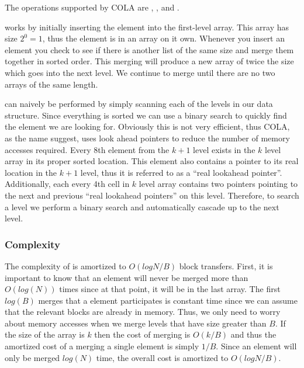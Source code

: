 \documentclass{style}
\begin{document}
The operations supported by COLA are \Search, \Insert, and \Scan.

\Insert works by initially inserting the element into the first-level array.
This array has size $2^0 = 1$, thus the element is in an array on it own.
Whenever you insert an element you check to see if there is another list of
the same size and merge them together in sorted order. This merging will
produce a new array of twice the size which goes into the next level. We
continue to merge until there are no two arrays of the same length.

\Search can naively be performed by simply scanning each of the levels in our
data structure. Since everything is sorted we can use a binary search to
quickly find the element we are looking for. Obviously this is not very
efficient, thus COLA, as the name suggest, uses look ahead pointers to reduce
the number of memory accesses required. Every 8th element from the $k+1$ level
exists in the $k$ level array in its proper sorted location. This element also
contains a pointer to its real location in the $k+1$ level, thus it is
referred to as a ``real lookahead pointer''. Additionally, each every 4th cell
in $k$ level array contains two pointers pointing to the next and previous
``real lookahead pointers'' on this level. Therefore, to search a level we
perform a binary search and automatically cascade up to the next level.

\subsubsection{Complexity}

The complexity of \Insert is amortized to $O(log N / B)$ block transfers.
First, it is important to know that an element will never be merged more than
$O(log(N))$ times since at that point, it will be in the last array. The first
$log(B)$ merges that a element participates is constant time since we can
assume that the relevant blocks are already in memory. Thus, we only need to
worry about memory accesses when we merge levels that have size greater than
$B$. If the size of the array is $k$ then the cost of merging is $O(k/B)$ and
thus the amortized cost of a merging a single element is simply $1/B$. Since
an element will only be merged $log(N)$ time, the overall cost is amortized to
$O(logN/B)$.
\end{document}
